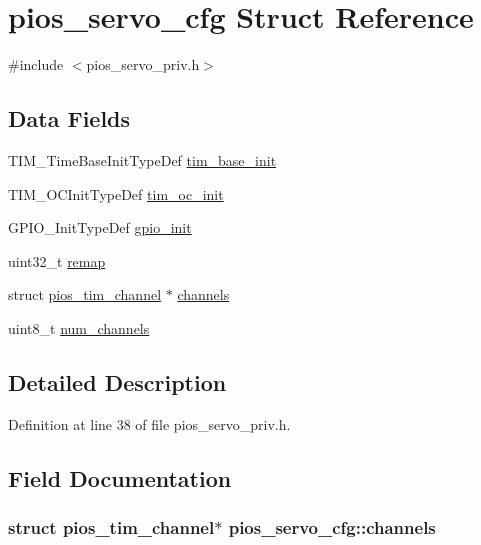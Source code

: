 \hypertarget{structpios__servo__cfg}{\section{pios\-\_\-servo\-\_\-cfg \-Struct \-Reference}
\label{structpios__servo__cfg}
}


{\ttfamily \#include $<$pios\-\_\-servo\-\_\-priv.\-h$>$}

\subsection*{\-Data \-Fields}
\begin{DoxyCompactItemize}
\item 
\-T\-I\-M\-\_\-\-Time\-Base\-Init\-Type\-Def \hyperlink{structpios__servo__cfg_afd81686ed67be0c809afa058df95ad44}{tim\-\_\-base\-\_\-init}
\item 
\-T\-I\-M\-\_\-\-O\-C\-Init\-Type\-Def \hyperlink{structpios__servo__cfg_ac1b8636b07f30c4a459b1c09eec6356a}{tim\-\_\-oc\-\_\-init}
\item 
\-G\-P\-I\-O\-\_\-\-Init\-Type\-Def \hyperlink{structpios__servo__cfg_a41b9d93e4e94a3a0c5e40a4e42c6d117}{gpio\-\_\-init}
\item 
uint32\-\_\-t \hyperlink{structpios__servo__cfg_a01880688c4a5e40c514d26c4d64e5efe}{remap}
\item 
struct \hyperlink{structpios__tim__channel}{pios\-\_\-tim\-\_\-channel} $\ast$ \hyperlink{structpios__servo__cfg_a40751521ecd39a052006bd47079de1da}{channels}
\item 
uint8\-\_\-t \hyperlink{structpios__servo__cfg_a94528872c23ad53d65dfb81ab86790fd}{num\-\_\-channels}
\end{DoxyCompactItemize}


\subsection{\-Detailed \-Description}


\-Definition at line 38 of file pios\-\_\-servo\-\_\-priv.\-h.



\subsection{\-Field \-Documentation}
\hypertarget{structpios__servo__cfg_a40751521ecd39a052006bd47079de1da}{
\subsubsection[{channels}]{\setlength{\rightskip}{0pt plus 5cm}struct {\bf pios\-\_\-tim\-\_\-channel}$\ast$ {\bf pios\-\_\-servo\-\_\-cfg\-::channels}}}\label{structpios__servo__cfg_a40751521ecd39a052006bd47079de1da}


